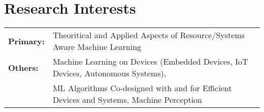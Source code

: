 \section{Research Interests}
\begin{tabular}{l l}
    \textbf{Primary:} & Theoritical and Applied Aspects of Resource/Systems Aware Machine Learning\\
    \textbf{Others:} & Machine Learning on Devices {(Embedded Devices, IoT Devices, Autonomous Systems)},\\
    & ML Algorithms Co-designed with and for Efficient Devices and Systems, Machine Perception\\
\end{tabular}\vspace{-2ex}


